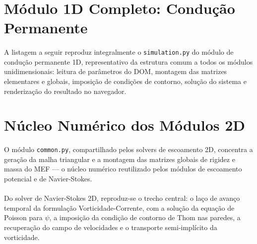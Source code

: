 \section{Módulo 1D Completo: Condução Permanente}
\label{ap:lst_conducao1d}

\paragraph{}A listagem a seguir reproduz integralmente o \texttt{simulation.py} do módulo de condução permanente 1D, representativo da estrutura comum a todos os módulos unidimensionais: leitura de parâmetros do DOM, montagem das matrizes elementares e globais, imposição de condições de contorno, solução do sistema e renderização do resultado no navegador.



\section{Núcleo Numérico dos Módulos 2D}
\label{ap:lst_nucleo2d}

\paragraph{}O módulo \texttt{common.py}, compartilhado pelos solvers de escoamento 2D, concentra a geração da malha triangular e a montagem das matrizes globais de rigidez e massa do MEF --- o núcleo numérico reutilizado pelos módulos de escoamento potencial e de Navier-Stokes.



\paragraph{}Do solver de Navier-Stokes 2D, reproduz-se o trecho central: o laço de avanço temporal da formulação Vorticidade-Corrente, com a solução da equação de Poisson para $\psi$, a imposição da condição de contorno de Thom nas paredes, a recuperação do campo de velocidades e o transporte semi-implícito da vorticidade.


